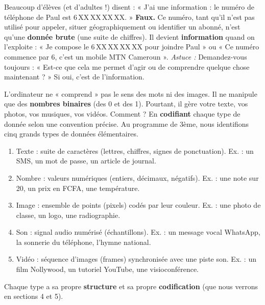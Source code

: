 \documentclass[11pt]{article}
\newcommand{\cle}[1]{{\popxbold\color{popdark}#1}}
\newcounter{popsec}
\newcounter{popsub}
\newcommand{\courssub}[1]{%
  \stepcounter{popsub}%
  \par\vspace{9pt}\noindent{\popxbold\fontsize{11.5}{13}\selectfont\color{popink}{\color{poporange}\thepopsec.\thepopsub}\hspace{6pt}#1}\par\nopagebreak\vspace{4pt}
}
\begin{document}
\begin{attention}
Beaucoup d'élèves (et d'adultes !) disent : « J'ai une information : le numéro de téléphone de Paul est 6\,XX\,XX\,XX\,XX. »
\textbf{Faux.} Ce numéro, tant qu'il n'est pas utilisé pour appeler, situer géographiquement ou identifier un abonné, n'est qu'une \textbf{donnée brute} (une suite de chiffres). Il devient \textbf{information} quand on l'exploite : « Je compose le 6\,XX\,XX\,XX\,XX pour joindre Paul » ou « Ce numéro commence par 6, c'est un mobile MTN Cameroun ».
\emph{Astuce :} Demandez-vous toujours : « Est-ce que cela me permet d'agir ou de comprendre quelque chose maintenant ? » Si oui, c'est de l'information.
\end{attention}

\courssub{Les principaux types de données}

L'ordinateur ne « comprend » pas le sens des mots ni des images. Il ne manipule que des \textbf{nombres binaires} (des 0 et des 1). Pourtant, il gère votre texte, vos photos, vos musiques, vos vidéos. Comment ? En \textbf{codifiant} chaque type de donnée selon une convention précise. Au programme de 3ème, nous identifions cinq grands types de données élémentaires.

\begin{definition}
\begin{enumerate}
    \item \cle{Texte} : suite de caractères (lettres, chiffres, signes de ponctuation). Ex. : un SMS, un mot de passe, un article de journal.
    \item \cle{Nombre} : valeurs numériques (entiers, décimaux, négatifs). Ex. : une note sur 20, un prix en FCFA, une température.
    \item \cle{Image} : ensemble de points (pixels) codés par leur couleur. Ex. : une photo de classe, un logo, une radiographie.
    \item \cle{Son} : signal audio numérisé (échantillons). Ex. : un message vocal WhatsApp, la sonnerie du téléphone, l'hymne national.
    \item \cle{Vidéo} : séquence d'images (frames) synchronisée avec une piste son. Ex. : un film Nollywood, un tutoriel YouTube, une visioconférence.
\end{enumerate}
Chaque type a sa propre \textbf{structure} et sa propre \textbf{codification} (que nous verrons en sections 4 et 5).
\end{definition}
\end{document}
